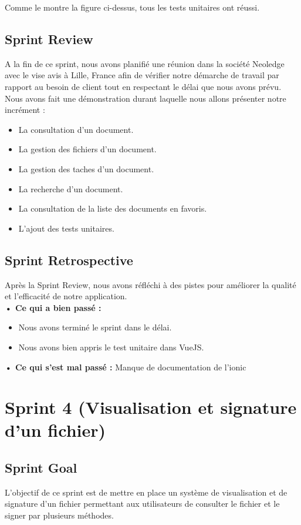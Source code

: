 Comme le montre la figure ci-dessus, tous les tests unitaires ont réussi.


\subsection{Sprint Review}
A la fin de ce sprint, nous avons planifié une réunion dans la société Neoledge avec le vise avis à Lille, France afin de vérifier notre démarche de travail par rapport au besoin de client tout en respectant le délai que nous avons prévu.
Nous avons fait une démonstration durant laquelle nous allons présenter notre incrément :
\begin{itemize}
  \item La consultation d'un document.
  \item La gestion des fichiers d'un document.
  \item La gestion des taches d'un document.
  \item La recherche d'un document.
  \item La consultation de la liste des documents en favoris.
  \item L'ajout des tests unitaires.
\end{itemize}

\subsection{Sprint Retrospective}

Après la Sprint Review, nous avons réfléchi à des pistes pour améliorer la qualité et l'efficacité de notre application.\\
\noindent\textbf{•	Ce qui a bien passé :}
\begin{itemize}
  \item Nous avons terminé le sprint dans le délai.
  \item Nous avons bien appris le test unitaire dans VueJS.
\end{itemize}
\noindent\textbf{•	Ce qui s'est mal passé :}
Manque de documentation de l'ionic 


\section{Sprint 4 (Visualisation et signature d'un fichier)}
\subsection{Sprint Goal}
L'objectif de ce sprint est de mettre en place un système de visualisation et de signature d'un fichier permettant aux utilisateurs de consulter le fichier et le signer par plusieurs méthodes.


